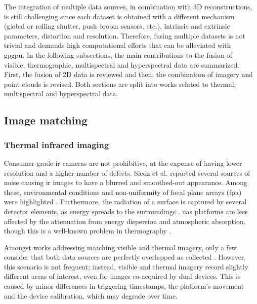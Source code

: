 The integration of multiple data sources, in combination with 3D reconstructions, is still challenging since each dataset is obtained with a different mechanism (global or rolling shutter, push broom sensors, etc.), intrinsic and extrinsic parameters, distortion and resolution. Therefore, fusing multiple datasets is not trivial and demands high computational efforts that can be alleviated with \acrshort{gpgpu}. In the following subsections, the main contributions to the fusion of visible, thermographic, multispectral and hyperspectral data are summarized. First, the fusion of 2D data is reviewed and then, the combination of imagery and point clouds is revised. Both sections are split into works related to thermal, multispectral and hyperspectral data. 

\subsection{Image matching}

\subsubsection{Thermal infrared imaging}

Consumer-grade \acrshort{ir} cameras are not prohibitive, at the expense of having lower resolution and a higher number of defects. Sledz et al. \cite{sledz_thermal_2018} reported several sources of noise causing \acrshort{ir} images to have a blurred and smoothed-out appearance. Among these, environmental conditions and non-uniformity of focal plane arrays (\acrshort{fpa}) were highlighted \cite{javadnejad_photogrammetric_2020}. Furthermore, the radiation of a surface is captured by several detector elements, as energy spreads to the surroundings \cite{vollmer_infrared_2017}. \acrshort{uas} platforms are less affected by the attenuation from energy dispersion and atmospheric absorption, though this is a well-known problem in thermography \cite{gonzalez_thermal_2019, vollmer_infrared_2017, quattrochi_thermal_1999}.

Amongst works addressing matching visible and thermal imagery, only a few consider that both data sources are perfectly overlapped as collected \cite{hou_fusing_2021, stojcsics_high_2018}. However, this scenario is not frequent; instead, visible and thermal imagery record slightly different areas of interest, even for images co-acquired by dual devices. This is caused by minor differences in triggering timestamps, the platform's movement and the device calibration, which may degrade over time. 

